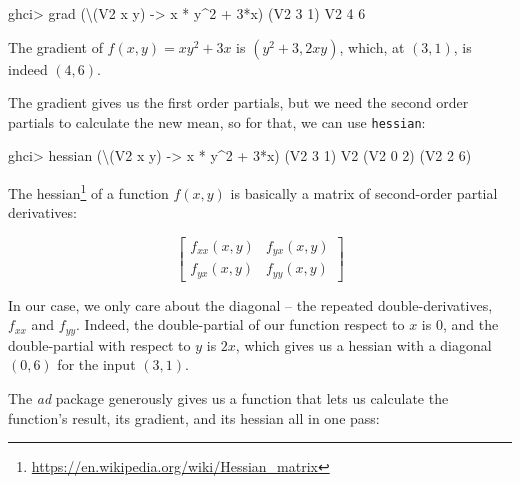 \documentclass[]{article}
\newenvironment{Shaded}{}{}
\newcommand{\DataTypeTok}[1]{\textcolor[rgb]{0.56,0.13,0.00}{{#1}}}
\newcommand{\DecValTok}[1]{\textcolor[rgb]{0.25,0.63,0.44}{{#1}}}
\newcommand{\OtherTok}[1]{\textcolor[rgb]{0.00,0.44,0.13}{{#1}}}
\newcommand{\FunctionTok}[1]{\textcolor[rgb]{0.02,0.16,0.49}{{#1}}}
\newcommand{\NormalTok}[1]{{#1}}
\renewcommand{\href}[2]{#2\footnote{\url{#1}}}
\begin{document}
\begin{Shaded}
\begin{Highlighting}[]
\NormalTok{ghci}\FunctionTok{>} \NormalTok{grad (\textbackslash{}(}\DataTypeTok{V2} \NormalTok{x y) }\OtherTok{->} \NormalTok{x }\FunctionTok{*} \NormalTok{y}\FunctionTok{^}\DecValTok{2} \FunctionTok{+} \DecValTok{3}\FunctionTok{*}\NormalTok{x) (}\DataTypeTok{V2} \DecValTok{3} \DecValTok{1}\NormalTok{)}
\DataTypeTok{V2} \DecValTok{4} \DecValTok{6}
\end{Highlighting}
\end{Shaded}

The gradient of \(f(x, y) = x y^2 + 3x\) is \((y^2 + 3, 2xy)\), which, at
\((3, 1)\), is indeed \((4, 6)\).

The gradient gives us the first order partials, but we need the second order
partials to calculate the new mean, so for that, we can use \texttt{hessian}:

\begin{Shaded}
\begin{Highlighting}[]
\NormalTok{ghci}\FunctionTok{>} \NormalTok{hessian (\textbackslash{}(}\DataTypeTok{V2} \NormalTok{x y) }\OtherTok{->} \NormalTok{x }\FunctionTok{*} \NormalTok{y}\FunctionTok{^}\DecValTok{2} \FunctionTok{+} \DecValTok{3}\FunctionTok{*}\NormalTok{x) (}\DataTypeTok{V2} \DecValTok{3} \DecValTok{1}\NormalTok{)}
\DataTypeTok{V2} \NormalTok{(}\DataTypeTok{V2} \DecValTok{0} \DecValTok{2}\NormalTok{)}
   \NormalTok{(}\DataTypeTok{V2} \DecValTok{2} \DecValTok{6}\NormalTok{)}
\end{Highlighting}
\end{Shaded}

The \href{https://en.wikipedia.org/wiki/Hessian_matrix}{hessian} of a function
\(f(x,y)\) is basically a matrix of second-order partial derivatives:

\[
\begin{bmatrix}
f_{xx}(x, y) & f_{yx}(x, y) \\
f_{yx}(x, y) & f_{yy}(x, y)
\end{bmatrix}
\]

In our case, we only care about the diagonal -- the repeated double-derivatives,
\(f_{xx}\) and \(f_{yy}\). Indeed, the double-partial of our function respect to
\(x\) is \(0\), and the double-partial with respect to \(y\) is \(2x\), which
gives us a hessian with a diagonal \((0, 6)\) for the input \((3, 1)\).

The \emph{ad} package generously gives us a function that lets us calculate the
function's result, its gradient, and its hessian all in one pass:
\end{document}
